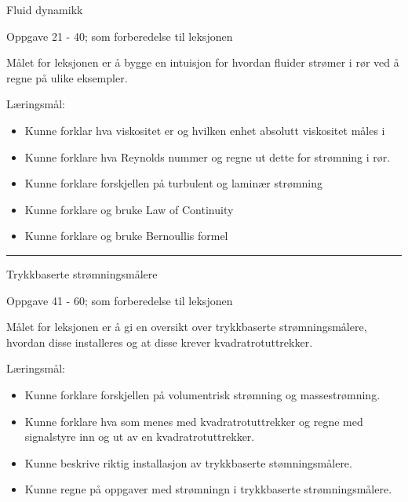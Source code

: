 \documentclass[12pt,a4paper]{article}
\begin{document}
\vskip 2pt  Fluid dynamikk

\vskip 2pt \noindent Oppgave 21 - 40;  som forberedelse til leksjonen%

\vskip 10pt

	Målet for leksjonen er å bygge en intuisjon for hvordan fluider strømer i rør ved å regne på ulike eksempler. 

	Læringsmål:
	\begin{itemize}[noitemsep]
		\item Kunne forklar hva viskositet er og hvilken enhet absolutt viskositet måles i 
		\item Kunne forklare hva Reynolds nummer og regne ut dette for strømning i rør.
		\item Kunne forklare forskjellen på turbulent og laminær strømning
		\item Kunne forklare og bruke Law of Continuity 
		\item Kunne forklare og bruke Bernoullis formel
	\end{itemize}


\filbreak
\hrule \vskip 5pt
\noindent {}

\vskip 5pt


\vskip 2pt  Trykkbaserte strømningsmålere

\vskip 2pt \noindent Oppgave 41 - 60;  som forberedelse til leksjonen%

\vskip 10pt


	Målet for leksjonen er å gi en oversikt over trykkbaserte strømningsmålere, hvordan disse installeres og at disse krever kvadratrotuttrekker. 

	Læringsmål:
	\begin{itemize}[noitemsep]
		\item Kunne forklare forskjellen på volumentrisk strømning og massestrømning.
		\item Kunne forklare hva som menes med kvadratrotuttrekker og regne med signalstyre inn og ut av en kvadratrotuttrekker.
		\item Kunne beskrive riktig installasjon av trykkbaserte stømningsmålere.
		\item Kunne regne på oppgaver med strømningn i trykkbaserte strømningsmålere. 
	\end{itemize}
\end{document}
